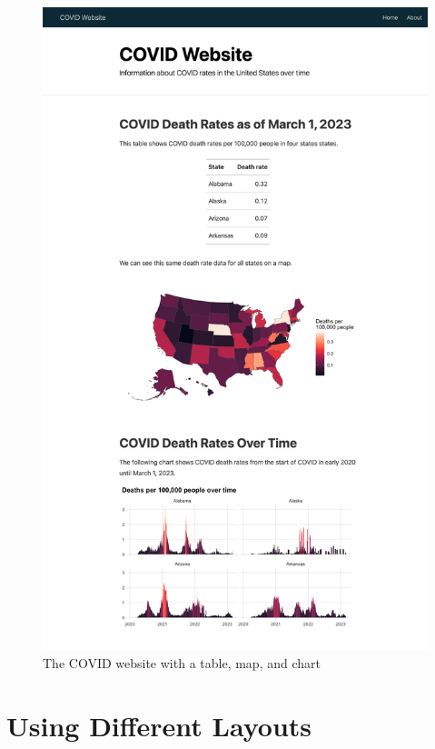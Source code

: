 \documentclass[
]{book}
\begin{document}
\begin{figure}
\includegraphics[width=1\linewidth]{assets/covid-website-static-page} \caption{The COVID website with a table, map, and chart}\label{fig:covid-website-static-page}
\end{figure}

\hypertarget{using-different-layouts}{%
\section*{Using Different Layouts}\label{using-different-layouts}}
\end{document}
